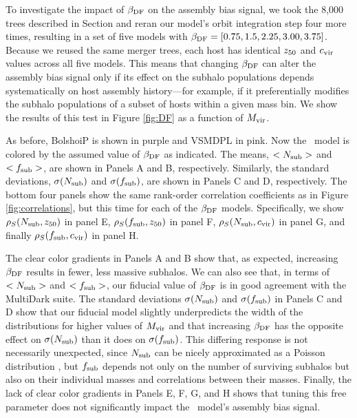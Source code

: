 \documentclass[twocolumn,apj,numberedappendix,twocolappendix,iop]{openjournal}
\begin{document}
To investigate the impact of $\beta_{\rm DF}$ on the assembly bias signal, we took the 8,000 trees described in Section \old{{\ref{sec:DF}}} \jsm{\ref{sec:satgen}} and reran our model's orbit integration step four more times, resulting in a set of five models with $\beta_{\rm DF} = [0.75, 1.5, 2.25, 3.00, 3.75]$. Because we reused the same merger trees, each host has identical $z_{50}$ and $c_{\rm vir}$ values across all five models. This means that changing $\beta_{\rm DF}$ can alter the assembly bias signal only if its effect on the subhalo populations depends systematically on host assembly history—for example, if it preferentially modifies the subhalo populations of a subset of hosts within a given mass bin. We show the results of this test in Figure \ref{fig:DF} as a function of $M_{\rm vir}$.

As before, BolshoiP is shown in purple and VSMDPL in pink. Now the \SatGen\ model is colored by the assumed value of $\beta_{\rm DF}$ as indicated. The means, $<N_{\rm sub}>$ and $<f_{\rm sub}>$, are shown in Panels A and B, respectively. Similarly, the standard deviations, $\sigma(N_{\rm sub})$ and $\sigma(f_{\rm sub})$, are shown in Panels C and D, respectively. The bottom four panels show the same rank-order correlation coefficients as in Figure \ref{fig:correlations}, but this time for each of the $\beta_{\rm DF}$ models. Specifically, we show $\rho_S(N_{\rm sub}, z_{50})$ in panel E, $\rho_S(f_{\rm sub}, z_{50})$ in panel F, $\rho_S(N_{\rm sub}, c_{\rm vir})$ in panel G, and finally $\rho_S(f_{\rm sub}, c_{\rm vir})$ in panel H. 

The clear color gradients in Panels A and B show that, as expected, increasing $\beta_{\rm DF}$ results in fewer, less massive subhalos. We can also see that, in terms of $<N_{\rm sub}>$ and $<f_{\rm sub}>$, our fiducial value of $\beta_{\rm DF}$ is in good agreement with the MultiDark suite. The standard deviations $\sigma(N_{\rm sub})$ and $\sigma(f_{\rm sub})$ in Panels C and D show that our fiducial model slightly underpredicts the width of the distributions for higher values of $M_{\rm vir}$ and that increasing $\beta_{\rm DF}$ has the opposite effect on $\sigma(N_{\rm sub})$ than it does on $\sigma(f_{\rm sub})$. This differing response is not necessarily unexpected, since $N_{\rm sub}$ can be nicely approximated as a Poisson distribution \citep{Jiang.vdBosch.17}, but $f_{\rm sub}$ depends not only on the number of surviving subhalos but also on their individual masses and correlations between their masses. Finally, the lack of clear color gradients in Panels E, F, G, and H shows that tuning this free parameter does not significantly impact the \SatGen\ model's assembly bias signal.
\end{document}
